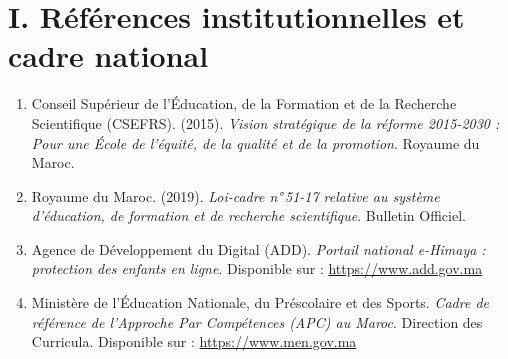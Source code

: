 \documentclass[12pt, a4paper, oneside]{report}
\begin{document}
\section*{I. Références institutionnelles et cadre national}
\begin{enumerate}[leftmargin=*]
  \item Conseil Supérieur de l'Éducation, de la Formation et de la Recherche Scientifique (CSEFRS). (2015). \textit{Vision stratégique de la réforme 2015-2030 : Pour une École de l'équité, de la qualité et de la promotion}. Royaume du Maroc.

  \item Royaume du Maroc. (2019). \textit{Loi-cadre n°\,51-17 relative au système d'éducation, de formation et de recherche scientifique}. Bulletin Officiel.

  \item Agence de Développement du Digital (ADD). \textit{Portail national e-Himaya : protection des enfants en ligne}. Disponible sur : \url{https://www.add.gov.ma}

  \item Ministère de l'Éducation Nationale, du Préscolaire et des Sports. \textit{Cadre de référence de l'Approche Par Compétences (APC) au Maroc}. Direction des Curricula. Disponible sur : \url{https://www.men.gov.ma}
\end{enumerate}
\end{document}
